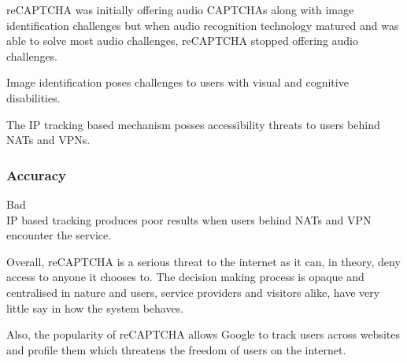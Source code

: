 reCAPTCHA was initially offering audio CAPTCHAs along with image identification
challenges but when audio recognition technology matured and was able to solve
most audio challenges, reCAPTCHA stopped offering audio challenges.

Image identification poses challenges to users with visual and cognitive
disabilities.

The IP tracking based mechanism posses accessibility threats to users behind
NATs and VPNs.

\subsubsection{Accuracy}
Bad\\

IP based tracking produces poor results when users behind NATs and VPN encounter
the service.


Overall, reCAPTCHA is a serious threat to the internet as it can, in theory,
deny access to anyone it chooses to. The decision making process is opaque and
centralised in nature and users, service providers and visitors alike, have very
little say in how the system behaves.

Also, the popularity of reCAPTCHA allows Google to track users across websites
and profile them which threatens the freedom of users on the internet.
